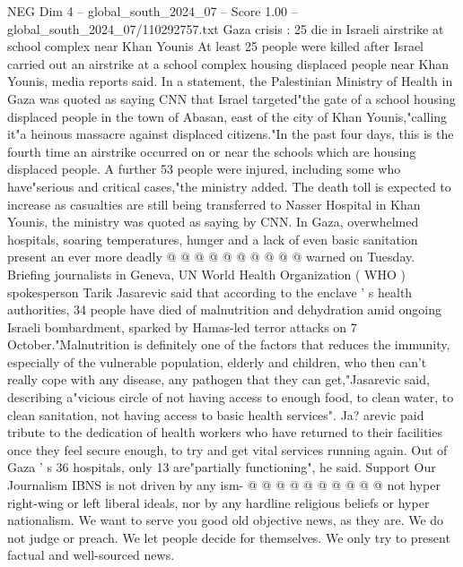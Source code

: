 \begin{textsample}{NEG Dim 4 – global\_south\_2024\_07 – Score 1.00 – global\_south\_2024\_07/110292757.txt}  \label{ex:f4_neg_350}
Gaza crisis : 25 die in Israeli airstrike at school complex near Khan Younis At least 25 people were killed after Israel carried out an airstrike at a school complex housing displaced people near Khan Younis, media reports said.
In a statement, the Palestinian Ministry of Health in Gaza was quoted as saying CNN that Israel targeted"the gate of a school housing displaced people in the town of Abasan, east of the city of Khan Younis,"calling it"a heinous massacre against displaced citizens."In the past four days, this is the fourth time an airstrike occurred on or near the schools which are housing displaced people.
A further 53 people were injured, including some who have"serious and critical cases,"the ministry added.
The death toll is expected to increase as casualties are still being transferred to Nasser Hospital in Khan Younis, the ministry was quoted as saying by CNN.
In Gaza, overwhelmed hospitals, soaring temperatures, hunger and a lack of even basic sanitation present an ever more deadly @ @ @ @ @ @ @ @ @ @ warned on Tuesday.
Briefing journalists in Geneva, UN World Health Organization ( WHO ) spokesperson Tarik Jasarevic said that according to the enclave ' s health authorities, 34 people have died of malnutrition and dehydration amid ongoing Israeli bombardment, sparked by Hamas-led terror attacks on 7 October."Malnutrition is definitely one of the factors that reduces the immunity, especially of the vulnerable population, elderly and children, who then can't really cope with any disease, any pathogen that they can get,"Jasarevic said, describing a"vicious circle of not having access to enough food, to clean water, to clean sanitation, not having access to basic health services".
Ja? arevic paid tribute to the dedication of health workers who have returned to their facilities once they feel secure enough, to try and get vital services running again.
Out of Gaza ' s 36 hospitals, only 13 are"partially functioning", he said.
Support Our Journalism IBNS is not driven by any ism- @ @ @ @ @ @ @ @ @ @ not hyper right-wing or left liberal ideals, nor by any hardline religious beliefs or hyper nationalism.
We want to serve you good old objective news, as they are.
We do not judge or preach.
We let people decide for themselves.
We only try to present factual and well-sourced news.

\end{textsample}
